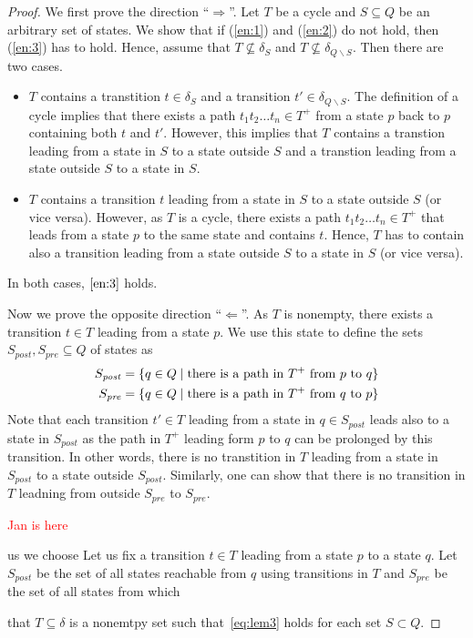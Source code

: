 \documentclass[a4paper,UKenglish,cleveref, autoref, thm-restate]{lipics-v2021}
\newcommand{\todo}[1]{\textcolor{red}{#1}}
\newcommand{\pre}{S_\mathit{pre}}
\newcommand{\post}{S_\mathit{post}}
\begin{document}
\begin{proof}
  We first prove the direction ``$\Longrightarrow$''. Let $T$ be a
  cycle and $S\subseteq Q$ be an arbitrary set of states. We show that
  if (\ref{en:1}) and (\ref{en:2}) do not hold, then (\ref{en:3}) has
  to hold. Hence, assume that $T\not\subseteq\delta_S$ and
  $T\not\subseteq\delta_{Q\smallsetminus S}$. Then there are two
  cases.
  \begin{itemize}
  \item $T$ contains a transtition $t\in\delta_S$ and a transition
    $t'\in\delta_{Q\smallsetminus S}$. The definition of a cycle
    implies that there exists a path $t_1t_2\ldots t_n\in T^+$ from a
    state $p$ back to $p$ containing both $t$ and $t'$. However, this
    implies that $T$ contains a transtion leading from a state in $S$
    to a state outside $S$ and a transtion leading from a state outside $S$
    to a state in $S$.
  \item $T$ contains a transition $t$ leading from a state in $S$ to a
    state outside $S$ (or vice versa). However, as $T$ is a cycle,
    there exists a path $t_1t_2\ldots t_n\in T^+$ that leads from a
    state $p$ to the same state and contains $t$. Hence, $T$ has to
    contain also a transition leading from a state outside $S$ to a
    state in $S$ (or vice versa).
  \end{itemize}
  In both cases, $\ref{en:3}$ holds.

  Now we prove the opposite direction ``$\Longleftarrow$''. As $T$ is
  nonempty, there exists a transition $t\in T$ leading from a state $p$.
  We use this state to define the sets $\post,\pre\subseteq Q$ of states as 
  \begin{align}\notag
    \post&=\{q\in Q\mid \textrm{there is a path in }T^+\textrm{ from }p\textrm{ to }q\}\\
    \pre &=\{q\in Q\mid \textrm{there is a path in }T^+\textrm{ from }q\textrm{ to }p\}
  \end{align}
  Note that each transition $t'\in T$ leading from a state in
  $q\in\post$ leads also to a state in $\post$ as the path in $T^+$
  leading form $p$ to $q$ can be prolonged by this transition. In
  other words, there is no transtition in $T$ leading from a state
  in $\post$ to a state outside $\post$. Similarly, one can show that
  there is no transition in $T$ leadning from outside $\pre$ to $\pre$.

  \todo{Jan is here}
  
  us we
  choose Let us fix
  a transition $t\in T$ leading from a state $p$ to a state $q$. Let
  $\post$ be the set of all states reachable from $q$ using
  transitions in $T$ and $\pre$ be the set of all states from which


  
  that $T\subseteq\delta$ is a nonemtpy set such that~\eqref{eq:lem3}
  holds for each set $S\subset Q$.
\end{proof}
\end{document}
